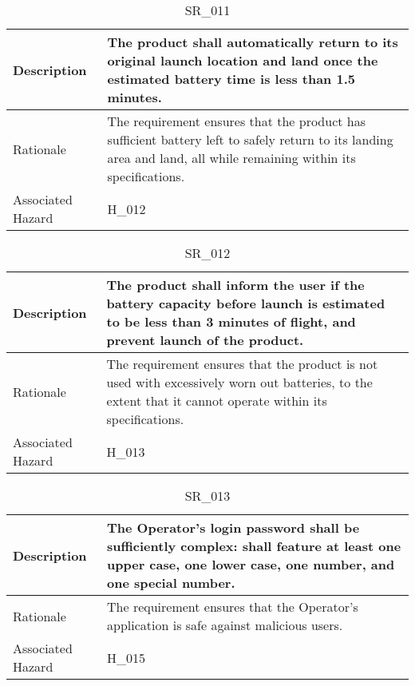 \documentclass{article}
\begin{document}
\begin{table}[!h]
\begin{center}
\caption {SR\_011} 
\label{SR_011}
\begin{tabular}{ | m{3cm} | m{11cm} | }
\hline
Description & The product shall automatically return to its original launch location and land once the estimated battery time is less than 1.5 minutes. \\
\hline
Rationale & The requirement ensures that the product has sufficient battery left to safely return to its landing area and land, all while remaining within its specifications. \\
\hline
Associated Hazard & H\_012 \\
\hline
\end{tabular}
\end{center}
\end{table}

\begin{table}[!h]
\begin{center}
\caption {SR\_012} 
\label{SR_012}
\begin{tabular}{ | m{3cm} | m{11cm} | }
\hline
Description & The product shall inform the user if the battery capacity before launch is estimated to be less than 3 minutes of flight, and prevent launch of the product. \\
\hline
Rationale & The requirement ensures that the product is not used with excessively worn out batteries, to the extent that it cannot operate within its specifications. \\
\hline
Associated Hazard & H\_013 \\
\hline
\end{tabular}
\end{center}
\end{table}

\begin{table}[!h]
\begin{center}
\caption {SR\_013} 
\label{SR_013}
\begin{tabular}{ | m{3cm} | m{11cm} | }
\hline
Description & The Operator's login password shall be sufficiently complex: shall feature at least one upper case, one lower case, one number, and one special number. \\
\hline
Rationale & The requirement ensures that the Operator's application is safe against malicious users. \\
\hline
Associated Hazard & H\_015 \\
\hline
\end{tabular}
\end{center}
\end{table}
\end{document}
